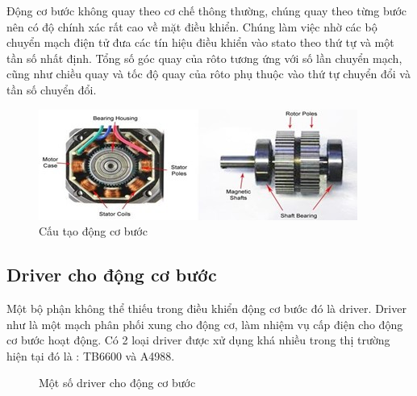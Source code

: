 Động cơ bước không quay theo cơ chế thông thường, chúng quay theo từng bước nên có độ chính xác rất cao về mặt điều khiển. Chúng làm việc nhờ các bộ chuyển mạch điện tử đưa các tín hiệu điều khiển vào stato theo thứ tự và một tần số nhất định. Tổng số góc quay của rôto tương ứng với số lần chuyển mạch, cũng như chiều quay và tốc độ quay của rôto phụ thuộc vào thứ tự chuyển đổi và tần số chuyển đổi.

\begin{figure}[htp]
\centering
\includegraphics[scale=1]{Chapters/Chapter4/Images/Cautaodongcobuoc.jpg}
\caption{Cấu tạo động cơ bước}
\label{fig:cautaodongcobuoc}
\end{figure}

\subsection{Driver cho động cơ bước}
Một bộ phận không thể thiếu trong điều khiển động cơ bước đó là driver. Driver như là một mạch phân phối xung cho động cơ, làm nhiệm vụ cấp điện cho động cơ bước hoạt động. Có 2 loại driver được xử dụng khá nhiều trong thị trường hiện tại đó là : TB6600 và A4988.

\begin{figure}[ht]
\hfill
{}
\caption{Một số driver cho động cơ bước}
\label{fig:2drivermotor}
\end{figure}

